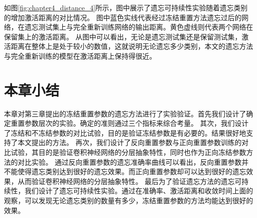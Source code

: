如图\ref{fig:chapter4_distance_4}所示，图中展示了遗忘可持续性实验随着遗忘类别的增加激活距离的对比情况。
图中蓝色实线代表经过冻结重置方法遗忘过后的网络，在遗忘测试集上与完全重新训练网络的输出距离。黄色虚线则代表两个网络在保留集上的激活距离。
从图中可以看出，无论是遗忘测试集还是保留测试集，激活距离在整体上是处于较小的数值，这就说明无论遗忘多少类别，本文的遗忘方法与完全重新训练的模型在激活距离上保持得很近。

\section{本章小结}
本章对第三章提出的冻结重置参数的遗忘方法进行了实验验证。首先我们设计了确定重置参数层次的实验。确定的准则通过三个指标来综合考量。
其次，我们设计了冻结和不冻结参数的对比试验，目的是验证冻结参数是有必要的。结果很好地支持了本文提出的方法。
再次，我们设计了反向重置参数与正向重置参数训练的对比试验，其目的是验证卷积神经网络的分层抽象特性，同时也作为正向冻结参数方法的对比实验。
通过反向重置参数的遗忘准确率曲线可以看出，反向重置参数并不能使得遗忘类别达到很好的遗忘效果。而正向重置参数却可以达到很好的遗忘效果，从而验证卷积神经网络的分层抽象特性。
最后为了验证遗忘方法的遗忘可持续性，我们设计了遗忘可持续性实验。通过在准确率、激活距离和收敛时间上面的观察，可以发现无论遗忘类别的数量有多少，冻结重置参数的方法均能达到很好的效果。

